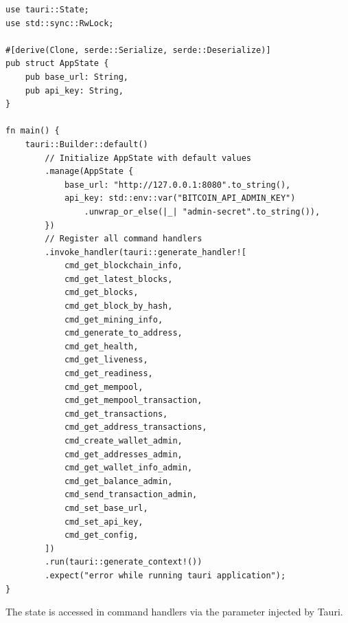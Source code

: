 \begin{listing}[htbp]
\caption{Main Tauri app setup ()}
\label{lst:ch17-main}
\begin{verbatim}
use tauri::State;
use std::sync::RwLock;

#[derive(Clone, serde::Serialize, serde::Deserialize)]
pub struct AppState {
    pub base_url: String,
    pub api_key: String,
}

fn main() {
    tauri::Builder::default()
        // Initialize AppState with default values
        .manage(AppState {
            base_url: "http://127.0.0.1:8080".to_string(),
            api_key: std::env::var("BITCOIN_API_ADMIN_KEY")
                .unwrap_or_else(|_| "admin-secret".to_string()),
        })
        // Register all command handlers
        .invoke_handler(tauri::generate_handler![
            cmd_get_blockchain_info,
            cmd_get_latest_blocks,
            cmd_get_blocks,
            cmd_get_block_by_hash,
            cmd_get_mining_info,
            cmd_generate_to_address,
            cmd_get_health,
            cmd_get_liveness,
            cmd_get_readiness,
            cmd_get_mempool,
            cmd_get_mempool_transaction,
            cmd_get_transactions,
            cmd_get_address_transactions,
            cmd_create_wallet_admin,
            cmd_get_addresses_admin,
            cmd_get_wallet_info_admin,
            cmd_get_balance_admin,
            cmd_send_transaction_admin,
            cmd_set_base_url,
            cmd_set_api_key,
            cmd_get_config,
        ])
        .run(tauri::generate_context!())
        .expect("error while running tauri application");
}
\end{verbatim}
\end{listing}

The state is accessed in command handlers via the  parameter injected by Tauri.

